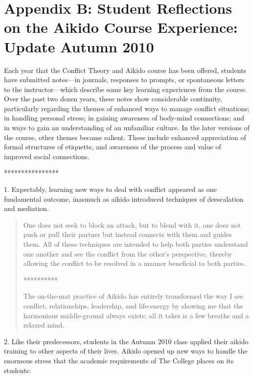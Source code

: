 \chapter*{Appendix B: Student Reflections on the Aikido Course Experience:
 Update Autumn 2010}

Each year that the Conflict Theory and Aikido course has been offered, students have submitted notes---in journals, responses to prompts, or spontaneous letters to the instructor---which describe some key learning experiences from the course. Over the past two dozen years, these notes show considerable continuity, particularly regarding the themes of enhanced ways to manage conflict situations; in handling personal stress; in gaining awareness of body-mind connections; and in ways to gain an understanding of an unfamiliar culture. In the later versions of the course, other themes became salient. These include enhanced appreciation of formal structures of etiquette, and awareness of the process and value of improved social connections.

\begin{center}****************\end{center}

1. Expectably, learning new ways to deal with conflict appeared as one fundamental outcome, inasmuch as aikido introduced techniques of deescalation and mediation.

\begin{quote}
One does not seek to block an attack, but to blend with it, one does not push or pull their partner but instead connects with them and guides them. All of these techniques are intended to help both parties understand one another and see the conflict from the other's perspective, thereby allowing the conflict to be resolved in a manner beneficial to both parties.

\begin{center}**********\end{center}

The on-the-mat practice of Aikido has entirely transformed the way I see conflict, relationships, leadership, and life-energy by showing me that the harmonious middle-ground always exists; all it takes is a few breaths and a relaxed mind.
\end{quote}

2. Like their predecessors, students in the Autumn 2010 class applied their aikido training to other aspects of their lives. Aikido opened up new ways to handle the enormous stress that the academic requirements of The College places on its students:

